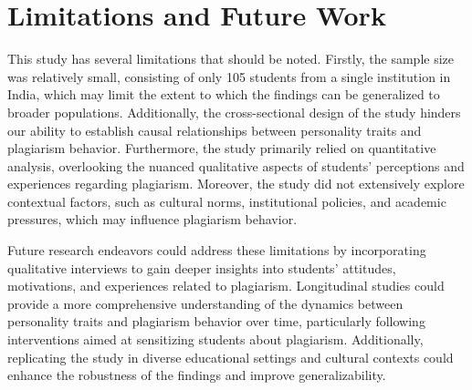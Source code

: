 \section{Limitations and Future Work}
\label{sec:limitations}
This study has several limitations that should be noted. Firstly, the sample size was relatively small, consisting of only 105 students from a single institution in India, which may limit the extent to which the findings can be generalized to broader populations. Additionally, the cross-sectional design of the study hinders our ability to establish causal relationships between personality traits and plagiarism behavior. Furthermore, the study primarily relied on quantitative analysis, overlooking the nuanced qualitative aspects of students' perceptions and experiences regarding plagiarism. Moreover, the study did not extensively explore contextual factors, such as cultural norms, institutional policies, and academic pressures, which may influence plagiarism behavior.

Future research endeavors could address these limitations by incorporating qualitative interviews to gain deeper insights into students' attitudes, motivations, and experiences related to plagiarism. Longitudinal studies could provide a more comprehensive understanding of the dynamics between personality traits and plagiarism behavior over time, particularly following interventions aimed at sensitizing students about plagiarism. Additionally, replicating the study in diverse educational settings and cultural contexts could enhance the robustness of the findings and improve generalizability.
 